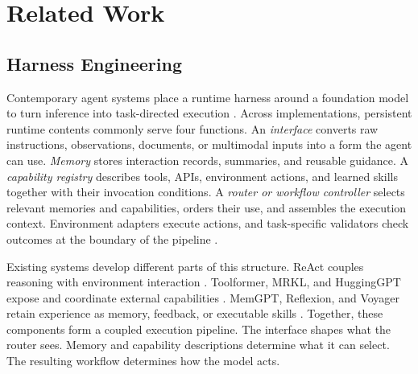 \documentclass{article}
\begin{document}
\section{Related Work}
\label{sec:related_work}

\subsection{Harness Engineering}
\label{sec:harness_structure}

Contemporary agent systems place a runtime harness around a foundation model
to turn inference into task-directed execution
\citep{li2026agentharness,meng_agent_2026_harness,
he_harness_2026,zhou2026harness}. Across implementations, persistent runtime
contents commonly serve four functions. An \emph{interface} converts raw
instructions, observations, documents, or multimodal inputs into a form the
agent can use. \emph{Memory} stores interaction records, summaries, and
reusable guidance. A \emph{capability registry} describes tools, APIs,
environment actions, and learned skills together with their invocation
conditions. A \emph{router or workflow controller} selects relevant memories
and capabilities, orders their use, and assembles the execution context.
Environment adapters execute actions, and task-specific validators check
outcomes at the boundary of the pipeline
\citep{gu2026modelscalingscalingscaling,
chen2026harnessxcomposableadaptiveevolvable}.


Existing systems develop different parts of this structure. ReAct couples
reasoning with environment interaction
\citep{yao2023react}. Toolformer, MRKL, and HuggingGPT expose and coordinate
external capabilities
\citep{schick2023toolformerlanguagemodelsteach,
karpas2022mrklsystemsmodularneurosymbolic,
shen2023hugginggptsolvingaitasks}. MemGPT, Reflexion, and Voyager retain
experience as memory, feedback, or executable skills
\citep{packer2024memgptllmsoperatingsystems,shinn2023reflexion,voyager}.
Together, these components form a coupled execution pipeline. The interface
shapes what the router sees. Memory and capability descriptions determine what
it can select. The resulting workflow determines how the model acts.
\end{document}
